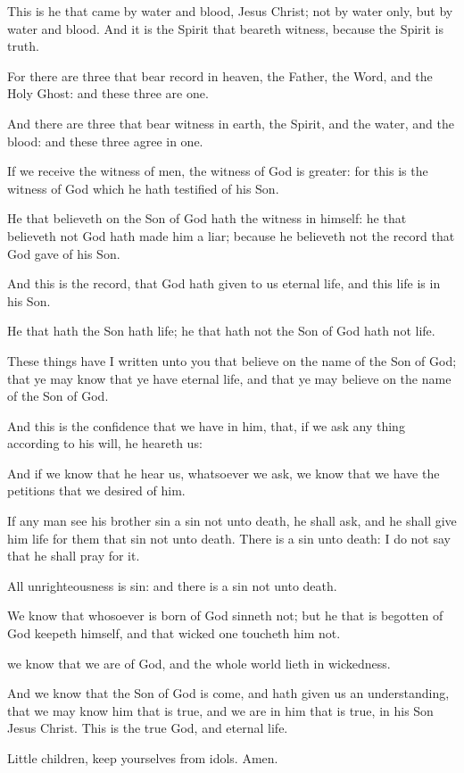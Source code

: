{This
is he that
came
by
water
and
blood,
{}
Jesus
Christ;
not
by
water
only,
but
by
water
and
blood.
And it
is the
Spirit that beareth
witness,
because the
Spirit
is
truth.

For there
are
three that bear
record
in
heaven, the
Father, the
Word,
and the
Holy
Ghost:
and
these
three
are
one.

And there
are
three that bear
witness
in
earth, the
Spirit,
and the
water,
and the
blood:
and
these
three
agree
in
one.

If we
receive the
witness of
men, the
witness of
God
is
greater:
for
this
is the
witness of
God
which he hath
testified
of
his
Son.

He that
believeth
on the
Son of
God
hath the
witness
in
himself: he that
believeth
not
God hath
made
him a
liar;
because he
believeth
not the
record
that
God
gave
of
his
Son.

And
this
is the
record,
that
God hath
given to
us
eternal
life,
and
this
life
is
in
his
Son.

He that
hath the
Son
hath
life;
{} he that
hath
not the
Son of
God
hath
not
life.

These
things have I
written unto
you that
believe
on the
name of the
Son of
God;
that ye may
know
that ye
have
eternal
life,
and
that ye may
believe
on the
name of the
Son of
God.

And
this
is the
confidence
that we
have
in
him,
that,
if we
ask any
thing according
to
his
will, he
heareth
us:

And
if we
know
that he
hear
us,
whatsoever we
ask, we
know
that we
have the
petitions
that we
desired
of
him.

If any
man
see
his
brother
sin a
sin
{}
not
unto
death, he shall
ask,
and he shall
give
him
life for them that
sin
not
unto
death. There
is a
sin
unto
death: I
do
not
say
that he shall
pray
for
it.

All
unrighteousness
is
sin:
and there
is a
sin
not
unto
death.

We
know
that
whosoever is
born
of
God
sinneth
not;
but he that is
begotten
of
God
keepeth
himself,
and
that wicked
one
toucheth
him
not.

 we
know
that we
are
of
God,
and the
whole
world
lieth
in
wickedness.

And we
know
that the
Son of
God is
come,
and hath
given
us an
understanding,
that we may
know him that is
true,
and we
are
in him that is
true,
{}
in
his
Son
Jesus
Christ.
This
is the
true
God,
and
eternal
life.

Little
children,
keep
yourselves
from
idols.
Amen.


\par }